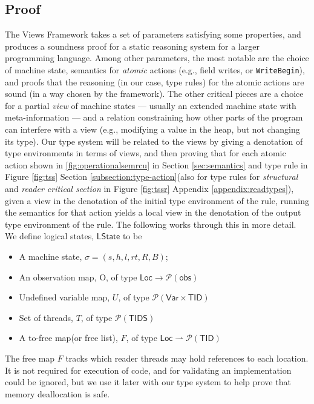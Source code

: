 \subsection{Proof}
\label{sec:proof}
The Views Framework takes a set of parameters satisfying some properties, and produces a soundness proof for a static reasoning system for a larger programming language.  Among other parameters, the most notable are the choice of machine state, semantics for \emph{atomic} actions (e.g., field writes, or \lstinline|WriteBegin|), and proofs that the reasoning (in our case, type rules) for the atomic actions are sound (in a way chosen by the framework).
The other critical pieces are a choice for a partial \emph{view} of machine states --- usually an extended machine state with meta-information --- and a relation constraining how other parts of the program can interfere with a view (e.g., modifying a value in the heap, but not changing its type).
Our type system will be related to the views by giving a denotation of type environments in terms of views, and then proving that for each atomic action shown in \ref{fig:operationalsemrcu} in Section \ref{sec:semantics} and type rule in Figure \ref{fig:tss} Section \ref{subsection:type-action}(also for type rules for \textit{structural} and \textit{reader critical section} in Figure \ref{fig:tssr} Appendix \ref{appendix:readtypes}), given a view in the denotation of the initial type environment of the rule, running the semantics for that action yields a local view in the denotation of the output type environment of the rule. The following works through this in more detail. We define logical states, $\textsf{LState}$ to be
\begin{itemize}
\item A machine state, $\sigma=(s,h,l,rt,R,B)$;
\item An observation map, O, of type $ \textsf{Loc} \to \mathcal{P}(\textsf{obs})$
\item Undefined variable map, $U$, of type $\mathcal{P}(\textsf{Var}\times \textsf{TID})$
\item Set of threads, $T$, of type $\mathcal{P}(\textsf{TIDS})$
\item A to-free map(or free list), $F$, of type $\textsf{Loc} \rightharpoonup \mathcal{P}(\textsf{TID})$
\end{itemize}
The free map $F$ tracks which reader threads may hold references to each location. It is not required for execution of code, and for validating an implementation could be ignored, but we use it later with our type system to help prove that memory deallocation is safe.

